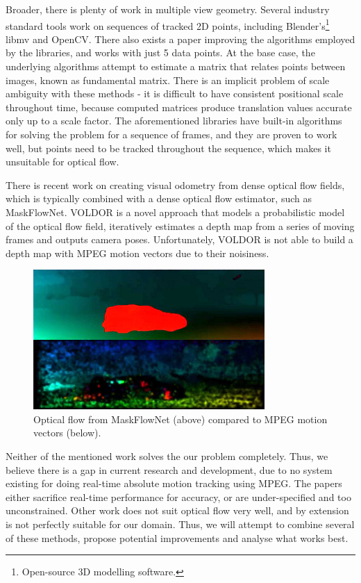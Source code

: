 \documentclass[11pt,english]{report}
\begin{document}
Broader, there is plenty of work in multiple view geometry. Several industry standard tools work on sequences of tracked 2D points, including Blender's\footnote{Open-source 3D modelling software.} libmv\cite{libmv} and OpenCV\cite{opencv5calib}. There also exists a paper improving the algorithms employed by the libraries, and works with just 5 data points\cite{1211470}. At the base case, the underlying algorithms attempt to estimate a matrix that relates points between images, known as fundamental matrix. There is an implicit problem of scale ambiguity\cite{hartley_zisserman_2004} with these methods - it is difficult to have consistent positional scale throughout time, because computed matrices produce translation values accurate only up to a scale factor. The aforementioned libraries have built-in algorithms for solving the problem for a sequence of frames, and they are proven to work well, but points need to be tracked throughout the sequence, which makes it unsuitable for optical flow.

There is recent work on creating visual odometry from dense optical flow fields\cite{voldor}, which is typically combined with a dense optical flow estimator, such as MaskFlowNet\cite{zhao2020maskflownet}. VOLDOR\cite{voldor} is a novel approach that models a probabilistic model of the optical flow field, iteratively estimates a depth map from a series of moving frames and outputs camera poses. Unfortunately, VOLDOR is not able to build a depth map with MPEG motion vectors due to their noisiness.

\begin{figure}[!ht]
	\centering
	\includegraphics[width=250pt]{docs/report/mpeg-maskflownet.jpg}
	\caption{\centering Optical flow from MaskFlowNet (above) compared to MPEG motion vectors (below).}
\end{figure}

Neither of the mentioned work solves the our problem completely. Thus, we believe there is a gap in current research and development, due to no system existing for doing real-time absolute motion tracking using MPEG. The papers either sacrifice real-time performance for accuracy, or are under-specified and too unconstrained. Other work does not suit optical flow very well, and by extension is not perfectly suitable for our domain. Thus, we will attempt to combine several of these methods, propose potential improvements and analyse what works best.
\end{document}

